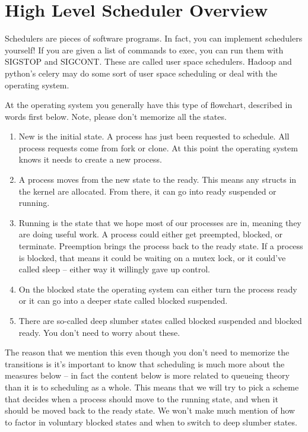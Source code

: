 \section{High Level Scheduler Overview}

Schedulers are pieces of software programs. In fact, you can implement schedulers yourself!
If you are given a list of commands to exec, you can run them with SIGSTOP and SIGCONT.
These are called user space schedulers.
Hadoop and python's celery may do some sort of user space scheduling or deal with the operating system.

At the operating system you generally have this type of flowchart, described in words first below.
Note, please don't memorize all the states.

\begin{enumerate}
\item New is the initial state. A process has just been requested to schedule. All process requests come from fork or clone. At this point the operating system knows it needs to create a new process.
\item A process moves from the new state to the ready. This means any structs in the kernel are allocated. From there, it can go into ready suspended or running.
\item Running is the state that we hope most of our processes are in, meaning they are doing useful work. A process could either get preempted, blocked, or terminate. Preemption brings the process back to the ready state. If a process is blocked, that means it could be waiting on a mutex lock, or it could've called sleep -- either way it willingly gave up control.
\item On the blocked state the operating system can either turn the process ready or it can go into a deeper state called blocked suspended.
\item There are so-called deep slumber states called blocked suspended and blocked ready. You don't need to worry about these.
\end{enumerate}

The reason that we mention this even though you don't need to memorize the transitions is it's important to know that scheduling is much more about the measures below -- in fact the content below is more related to queueing theory than it is to scheduling as a whole.
This means that we will try to pick a scheme that decides when a process should move to the running state, and when it should be moved back to the ready state.
We won't make much mention of how to factor in voluntary blocked states and when to switch to deep slumber states.

